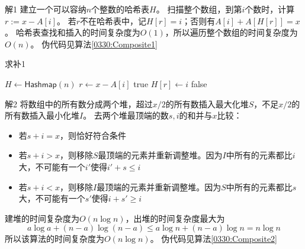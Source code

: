 \begin{questions}
\begin{solution}
        \textsf{解1}\quad
        建立一个可以容纳$n$个整数的哈希表$H$。
        扫描整个数组，到第$i$个数时，计算$r := x - A[i]$。
        若$r$不在哈希表中，记$H[r] = i$；否则有$A[i] + A\left[H[r]\right] = x$。
        哈希表查找和插入的时间复杂度为$O(1)$，所以遍历整个数组的时间复杂度为$O(n)$。
        伪代码见算法\ref{0330:Composite1}
    \end{solution}

    \begin{algorithm}[!htp]
        \caption{求补1}\label{0330:Composite1}
        \begin{algorithmic}[1]
            \State $H \gets \mathsf{Hashmap}(n)$
            \State $r \gets x - A[i]$
            \State \Return \textsf{true} 
            \Else
            \State $H[r] \gets i$
            \EndIf
            \EndFor
            \State \Return \textsf{false}
        \end{algorithmic}
    \end{algorithm}

    \begin{solution}
        \textsf{解2}
        将数组中的所有数分成两个堆，超过$x/2$的所有数插入最大化堆$S$，不足$x/2$的所有数插入最小化堆$I$。
        去两个堆最顶端的数$s,i$的和并与$x$比较：
        \begin{itemize}
            \item 若$s + i = x$，则恰好符合条件
            \item 若$s + i > x$，则移除$S$最顶端的元素并重新调整堆。因为$I$中所有的元素都比$i$大，不可能有一个$i'$使得$i' + s \le i$
            \item 若$s + i < x$，则移除$I$最顶端的元素并重新调整堆。因为$S$中所有的元素都比$s$大，不可能有一个$s'$使得$i + s' \ge i$
        \end{itemize}

        建堆的时间复杂度为$O(n \log n)$，出堆的时间复杂度最大为\[
            a \log a + (n-a) \log (n-a) \le a \log n + (n-a) \log n = n \log n
        \]
        所以该算法的时间复杂度为$O(n\log n)$。
        伪代码见算法\ref{0330:Composite2}

    \end{solution}


\end{questions}

